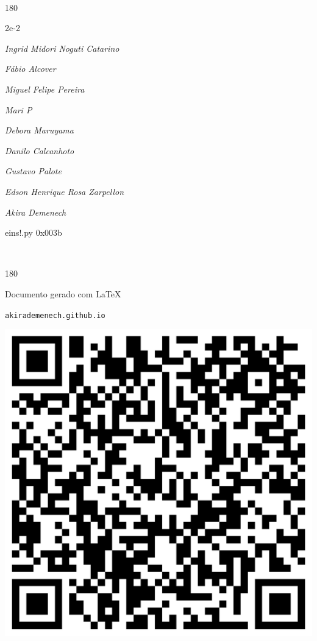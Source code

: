 \documentclass[12pt]{article}
\begin{document}
	\ 
	\vfill
	\begin{turn}{180}	
		\begin{minipage}{\textwidth}
		  	\ttfamily %
			\centering
			{\Huge 2e-2}
		  
			\hfill
		  
			

\textit{\small Ingrid Midori Noguti Catarino}

\textit{\small Fábio Alcover}

\textit{\small Miguel Felipe Pereira}

\textit{\small Mari P}

\textit{\small Debora Maruyama}

\textit{\small Danilo Calcanhoto}

\textit{\small Gustavo Palote}

\textit{\small Edson Henrique Rosa Zarpellon}

\textit{\small Akira Demenech}

\bigskip

eins!.py
0x003b


		\end{minipage}	
	\end{turn}
	\vfill
	\

\pagebreak

	\begin{turn}{180}	
		\begin{minipage}{\textwidth}		  
		  Documento gerado com \LaTeX			
		  
		  \texttt{akirademenech.github.io}

		  \includegraphics[height=0.3\textheight]{2e-2.pdf}

		\end{minipage}	
	\end{turn}  
		  
\end{document}
